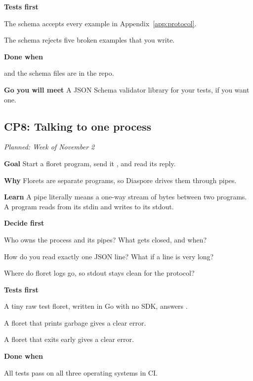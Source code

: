 \documentclass[11pt,letterpaper]{article}
\newcommand{\code}[1]{\texttt{\detokenize{#1}}}
\newcommand{\lbl}[1]{\textbf{#1}\enspace}
\newcommand{\when}[1]{\par\textit{Planned: #1}\par}
\begin{document}
\lbl{Tests first}
\begin{checks}
  \item The schema accepts every example in Appendix~\ref{app:protocol}.
  \item The schema rejects five broken examples that you write.
\end{checks}

\lbl{Done when}
\begin{checks}
  \item \code{PROTOCOL.md} and the schema files are in the repo.
\end{checks}

\lbl{Go you will meet} A JSON Schema validator library for your tests, if you want one.

\subsection{CP8: Talking to one process}
\when{Week of November 2}

\lbl{Goal} Start a floret program, send it \code{init}, and read its reply.

\lbl{Why} Florets are separate programs, so Diaspore drives them through pipes.

\lbl{Learn} A pipe literally means a one-way stream of bytes between two programs. A program reads from its stdin and writes to its stdout.

\lbl{Decide first}
\begin{asks}
  \item Who owns the process and its pipes? What gets closed, and when?
  \item How do you read exactly one JSON line? What if a line is very long?
  \item Where do floret logs go, so stdout stays clean for the protocol?
\end{asks}

\lbl{Tests first}
\begin{checks}
  \item A tiny raw test floret, written in Go with no SDK, answers \code{init}.
  \item A floret that prints garbage gives a clear error.
  \item A floret that exits early gives a clear error.
\end{checks}

\lbl{Done when}
\begin{checks}
  \item All tests pass on all three operating systems in CI.
\end{checks}
\end{document}
